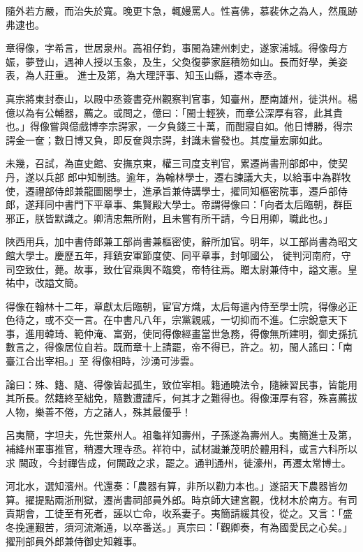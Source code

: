\begin{pinyinscope}
 隨外若方嚴，而治失於寬。晚更卞急，輒嫚罵人。性喜佛，慕裴休之為人，然風跡弗逮也。



 章得像，字希言，世居泉州。高祖仔鈞，事閩為建州刺史，遂家浦城。得像母方娠，夢登山，遇神人授以玉象，及生，父奐復夢家庭積笏如山。長而好學，美姿表，為人莊重。
 進士及第，為大理評事、知玉山縣，遷本寺丞。



 真宗將東封泰山，以殿中丞簽書兗州觀察判官事，知臺州，歷南雄州，徙洪州。楊億以為有公輔器，薦之。或問之，億曰：「閩士輕狹，而章公深厚有容，此其貴也。」得像嘗與億戲博李宗諤家，一夕負錢三十萬，而酣寢自如。他日博勝，得宗諤金一奩；數日博又負，即反奩與宗諤，封識未嘗發也。其度量宏廓如此。



 未幾，召試，為直史館、安撫京東，權三司度支判官，累遷尚書刑部郎中，使契丹，遂以兵部
 郎中知制誥。逾年，為翰林學士，遷右諫議大夫，以給事中為群牧使，遷禮部侍郎兼龍圖閣學士，進承旨兼侍講學士，擢同知樞密院事，遷戶部侍郎，遂拜同中書門下平章事、集賢殿大學士。帝謂得像曰：「向者太后臨朝，群臣邪正，朕皆默識之。卿清忠無所附，且未嘗有所干請，今日用卿，職此也。」



 陜西用兵，加中書侍郎兼工部尚書兼樞密使，辭所加官。明年，以工部尚書為昭文館大學士。慶歷五年，拜鎮安軍節度使、同平章事，封郇國公，
 徙判河南府，守司空致仕，薨。故事，致仕官乘輿不臨奠，帝特往焉。贈太尉兼侍中，謚文憲。皇祐中，改謚文簡。



 得像在翰林十二年，章獻太后臨朝，宦官方熾，太后每遣內侍至學士院，得像必正色待之，或不交一言。在中書凡八年，宗黨親戚，一切抑而不進。仁宗銳意天下事，進用韓琦、範仲淹、富弼，使同得像經畫當世急務，得像無所建明，御史孫抗數言之，得像居位自若。既而章十上請罷，帝不得已，許之。初，閩人謠曰：「南臺江合出宰相。」至
 得像相時，沙湧可涉雲。



 論曰：殊、籍、隨、得像皆起孤生，致位宰相。籍通曉法令，隨練習民事，皆能用其所長。然籍終至絀免，隨數遭譴斥，何其才之難得也。得像渾厚有容，殊喜薦拔人物，樂善不倦，方之諸人，殊其最優乎！



 呂夷簡，字坦夫，先世萊州人。祖龜祥知壽州，子孫遂為壽州人。夷簡進士及第，補絳州軍事推官，稍遷大理寺丞。祥符中，試材識兼茂明於體用科，或言六科所以求
 闕政，今封禪告成，何闕政之求，罷之。通判通州，徙濠州，再遷太常博士。



 河北水，選知濱州。代還奏：「農器有算，非所以勸力本也。」遂詔天下農器皆勿算。擢提點兩浙刑獄，遷尚書祠部員外郎。時京師大建宮觀，伐材木於南方。有司責期會，工徒至有死者，誣以亡命，收系妻子。夷簡請緩其役，從之。又言：「盛冬挽運艱苦，須河流漸通，以卒番送。」真宗曰：「觀卿奏，有為國愛民之心矣。」擢刑部員外郎兼侍御史知雜事。




\end{pinyinscope}
